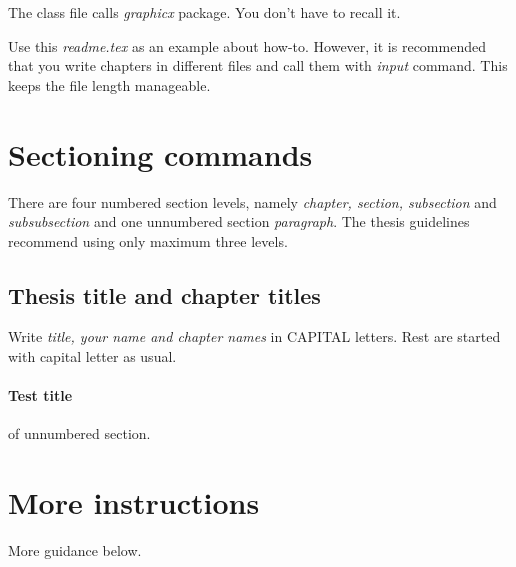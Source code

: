 \documentclass[]{dithesis}
\begin{document}
The class file calls \emph{graphicx} package. You don't have to recall it.

Use this \emph{readme.tex} as an example about how-to. However, it is recommended that you write chapters in different files and call them with \emph{input} command. This keeps the file length manageable.  

\section{Sectioning commands}
There are four numbered section levels, namely \textit{chapter, section, subsection} and \textit{subsubsection} and one unnumbered section \textit{paragraph}. The thesis guidelines \cite{dithe} recommend using only maximum three levels. 

\subsection{Thesis title and chapter titles}
Write \emph{title, your name \textrm{and} chapter names} in CAPITAL letters. Rest are started with capital letter as usual. 

\paragraph{Test title}
of unnumbered section.

\section{More instructions}
More guidance below.
\end{document}

